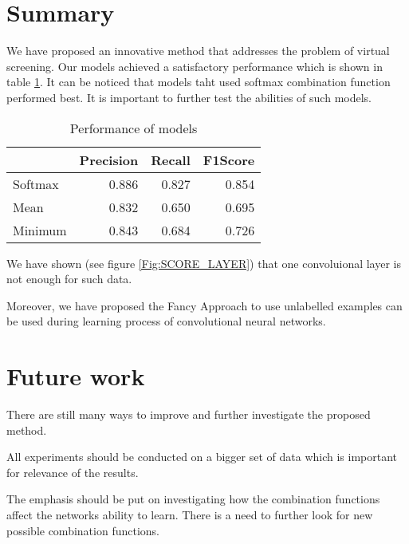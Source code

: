 \documentclass[a4paper,10pt]{report}
\begin{document}
    \section{Summary}
    We have proposed an innovative method that addresses the problem of virtual screening. Our models achieved a satisfactory performance which is shown in table \ref{performance}. It can be noticed that models taht used softmax combination function performed best. It is important to further test the abilities of such models.
    
    \begin{table}[ht]\label{performance}
    \caption{Performance of models}
    \centering 
    \begin{center}
    \begin{tabular}{lrrr}
    \hline
             & Precision  & Recall   & F1Score  \\
    \hline
    Softmax  & 0.886      & 0.827    & 0.854   \\
    Mean     & 0.832      & 0.650    & 0.695   \\
    Minimum  & 0.843      & 0.684    & 0.726   \\
    \hline
    \end{tabular}
    \end{center}
    \end{table}
    
    We have shown (see figure \ref{Fig:SCORE_LAYER}) that one convoluional layer is not enough for such data.
    
    Moreover, we have proposed the Fancy Approach to use unlabelled examples can be used during learning process of convolutional neural networks. 
  
    \section{Future work}
      There are still many ways to improve and further investigate the proposed method.
      
      All experiments should be conducted on a bigger set of data which is important for relevance of the results.
      
      The emphasis should be put on investigating how the combination functions affect the networks ability to learn. There is a need to further look for new possible combination functions.
      
\end{document}
